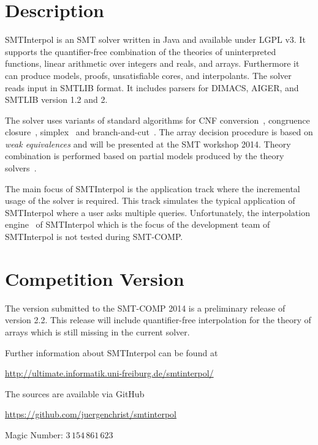 \documentclass{article}
\title{\SI\\{\large Version \version}}
\author{J\"urgen Christ, Jochen Hoenicke\\
  University of Freiburg\\
  \texttt{\{christj,hoenicke\}@informatik.uni-freiburg.de}}
\newcommand\SI{SMTInterpol\xspace}
\begin{document}
\maketitle
\section*{Description}
\SI is an SMT solver written in Java and available under LGPL v3.  It supports
the quantifier-free combination of the theories of uninterpreted functions,
linear arithmetic over integers and reals, and arrays.  Furthermore it can
produce models, proofs, unsatisfiable cores, and interpolants.  The solver
reads input in SMTLIB format.  It includes parsers for DIMACS, AIGER, and
SMTLIB version 1.2 and 2.

The solver uses variants of standard algorithms for CNF
conversion~\cite{DBLP:journals/jsc/PlaistedG86}, congruence
closure~\cite{DBLP:conf/rta/NieuwenhuisO05}, simplex~\cite{DBLP:conf/cav/DutertreM06} and
branch-and-cut~\cite{DBLP:conf/cav/DilligDA09}.
The array decision procedure is based on \emph{weak equivalences} and will be
presented at the SMT workshop 2014.
Theory combination is performed based on partial models produced by the theory
solvers~\cite{DBLP:journals/entcs/MouraB08}.

The main focus of \SI is the application track where the incremental usage of
the solver is required.  This track simulates the typical application of \SI
where a user asks multiple queries.  Unfortunately, the interpolation
engine~\cite{DBLP:conf/tacas/ChristHN13} of \SI which is the focus of the
development team of \SI is not tested during SMT-COMP.

\section*{Competition Version}
The version submitted to the SMT-COMP 2014 is a preliminary release of version
2.2.  This release will include quantifier-free interpolation for the theory
of arrays which is still missing in the current solver.

Further information about \SI can be found at
\begin{center}
  \url{http://ultimate.informatik.uni-freiburg.de/smtinterpol/}
\end{center}
The sources are available via GitHub
\begin{center}
  \url{https://github.com/juergenchrist/smtinterpol}
\end{center}

Magic Number: $3\,154\,861\,623$



\end{document}
